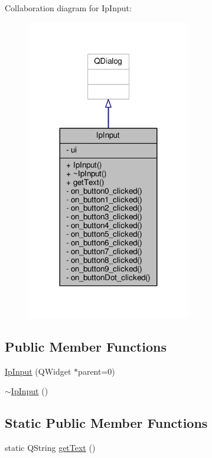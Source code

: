 Collaboration diagram for Ip\+Input\+:
\nopagebreak
\begin{figure}[H]
\begin{center}
\leavevmode
\includegraphics[width=203pt]{classIpInput__coll__graph}
\end{center}
\end{figure}
\subsection*{Public Member Functions}
\begin{DoxyCompactItemize}
\item 
\hyperlink{classIpInput_aed9e4a942a9ffd744b05c40e5fb3d506}{Ip\+Input} (Q\+Widget $\ast$parent=0)
\item 
\hyperlink{classIpInput_ab194007adfec0b4c8ed44e3f6531ac44}{$\sim$\+Ip\+Input} ()
\end{DoxyCompactItemize}
\subsection*{Static Public Member Functions}
\begin{DoxyCompactItemize}
\item 
static Q\+String \hyperlink{classIpInput_a4cf4786bfd38290ffb42399eefc11815}{get\+Text} ()
\end{DoxyCompactItemize}
